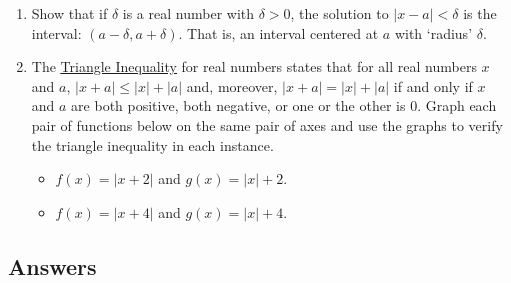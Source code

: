 \documentclass{ximera}
\begin{document}
\begin{enumerate}
\setcounter{enumi}{\value{HW}}

\item  Show that if $\delta$ is a real number with $\delta > 0$, the solution to $|x-a| < \delta$ is the interval:  $(a - \delta, a + \delta)$.  That is, an interval centered at $a$ with `radius' $\delta$.

\item  \label{triangleinequalityreals}  The \href{http://en.wikipedia.org/wiki/Triangle_inequality}{\underline{Triangle Inequality}}  for real numbers states that for all real numbers $x$ and $a$, $|x+a| \leq |x| + |a|$ and, moreover, $|x+a| = |x|+|a|$ if and only if $x$ and $a$ are both positive, both negative, or one or the other is $0$.  Graph each pair of functions below on the same pair of axes and use the graphs to verify the triangle inequality in each instance.

\enlargethispage{0.25in}

\begin{multicols}{2}

\begin{itemize}

\item  $f(x) = |x+2|$ and $g(x) = |x|+2$.

\item  $f(x) = |x+4|$ and $g(x) = |x|+4$.

\end{itemize}

\end{multicols}

 
 \setcounter{HW}{\value{enumi}}
\end{enumerate}




\newpage


\subsection{Answers}
\end{document}
